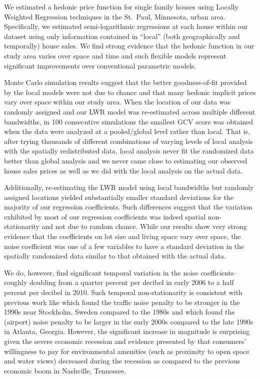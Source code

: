 \documentclass{article}\usepackage{graphicx, color}
\begin{document}
We estimated a hedonic price function for single family houses using Locally Weighted Regression techniques in the St.\ Paul, Minnesota, urban area. Specifically, we estimated semi-logarithmic regressions at each house within our dataset using only information contained in ``local'' (both geographically and temporally) house sales. We find strong evidence that the hedonic function in our study area varies over space and time and such flexible models represent significant improvements over conventional parametric models. 

Monte Carlo simulation results suggest that the better goodness-of-fit provided by the local models were not due to chance and that many hedonic implicit prices vary over space within our study area. When the location of our data was randomly assigned and our LWR model was re-estimated across multiple different bandwidths, in 100 consecutive simulations the smallest GCV score was obtained when the data were analyzed at a pooled/global level rather than local. That is, after trying thousands of different combinations of varying levels of local analysis with the spatially redistributed data, local analysis never fit the randomized data better than global analysis and we never came close to estimating our observed house sales prices as well as we did with the local analysis on the actual data. 

Additionally, re-estimating the LWR model using local bandwidths but randomly assigned locations yielded substantially smaller standard deviations for the majority of our regression coefficients. Such differences suggest that the variation exhibited by most of our regression coefficients was indeed spatial non-stationarity and not due to random chance. While our results show very strong evidence that the coefficients on lot size and living space vary over space, the noise coefficient was one of a few variables to have  a standard deviation in the spatially randomized data similar to that obtained with the actual data.

We do, however, find significant temporal variation in the noise coefficients-- roughly doubling from a quarter percent per decibel in early 2006 to a half percent per decibel in 2010. Such temporal non-stationarity is consistent with previous work like \citet{Wilhelmsson2000} which found the traffic noise penalty to be stronger in the 1990s near Stockholm, Sweden compared to the 1980s and \citet{Cohen2009} which found the (airport) noise penalty to be larger in the early 2000s compared to the late 1990s in Atlanta, Georgia. However, the significant increase in magnitude is surprising given the severe economic recession and evidence presented by \citet{Cho2011b} that consumers' willingness to pay for environmental amenities (such as proximity to open space and water views) decreased during the recession as compared to the previous economic boom in Nashville, Tennessee.
\end{document}
